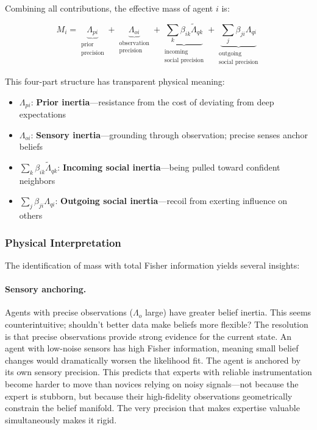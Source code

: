 \documentclass[12pt]{article}
\begin{document}
Combining all contributions, the effective mass of agent $i$ is:

\begin{equation}
\boxed{
M_i = \underbrace{\Lambda_{pi}}_{\substack{\text{prior} \\ \text{precision}}} + \underbrace{\Lambda_{oi}}_{\substack{\text{observation} \\ \text{precision}}} + \underbrace{\sum_k \beta_{ik}\tilde{\Lambda}_{qk}}_{\substack{\text{incoming} \\ \text{social precision}}} + \underbrace{\sum_j \beta_{ji}\Lambda_{qi}}_{\substack{\text{outgoing} \\ \text{social precision}}}
}
\end{equation}

This four-part structure has transparent physical meaning:
\begin{itemize}
    \item $\Lambda_{pi}$: \textbf{Prior inertia}—resistance from the cost of deviating from deep expectations
    \item $\Lambda_{oi}$: \textbf{Sensory inertia}—grounding through observation; precise senses anchor beliefs
    \item $\sum_k \beta_{ik}\tilde{\Lambda}_{qk}$: \textbf{Incoming social inertia}—being pulled toward confident neighbors
    \item $\sum_j \beta_{ji}\Lambda_{qi}$: \textbf{Outgoing social inertia}—recoil from exerting influence on others
\end{itemize}

\subsubsection{Physical Interpretation}

The identification of mass with total Fisher information yields several insights:

\paragraph{Sensory anchoring.} Agents with precise observations ($\Lambda_o$ large) have greater belief inertia. This seems counterintuitive; shouldn't better data make beliefs more flexible? The resolution is that precise observations provide strong evidence for the current state. An agent with low-noise sensors has high Fisher information, meaning small belief changes would dramatically worsen the likelihood fit. The agent is anchored by its own sensory precision. This predicts that experts with reliable instrumentation become harder to move than novices relying on noisy signals---not because the expert is stubborn, but because their high-fidelity observations geometrically constrain the belief manifold. The very precision that makes expertise valuable simultaneously makes it rigid.
\end{document}
